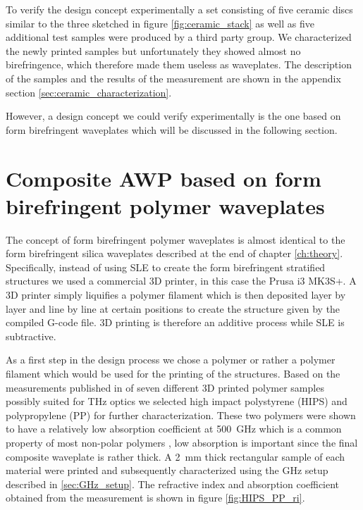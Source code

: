 To verify the design concept experimentally a set consisting of five ceramic discs similar to the three sketched in figure \ref{fig:ceramic_stack} as well as five additional test samples were produced by a third party group. We characterized the newly printed samples but unfortunately they showed almost no birefringence, which therefore made them useless as waveplates. The description of the samples and the results of the measurement are shown in the appendix section \ref{sec:ceramic_characterization}. 

However, a design concept we could verify experimentally is the one based on form birefringent waveplates which will be discussed in the following section.

\section{Composite AWP based on form birefringent polymer waveplates}
The concept of form birefringent polymer waveplates is almost identical to the form birefringent silica waveplates described at the end of chapter \ref{ch:theory}. Specifically, instead of using SLE to create the form birefringent stratified structures we used a commercial 3D printer, in this case the Prusa i3 MK3S+. A 3D printer simply liquifies a polymer filament which is then deposited layer by layer and line by line at certain positions to create the structure given by the compiled G-code file. 3D printing is therefore an additive process while SLE is subtractive.

As a first step in the design process we chose a polymer or rather a polymer filament which would be used for the printing of the structures. Based on the measurements published in \cite{Busch2014} of seven different 3D printed polymer samples possibly suited for THz optics we selected high impact polystyrene (HIPS) and polypropylene (PP) for further characterization. These two polymers were shown to have a relatively low absorption coefficient at \SI{500}{\giga \hertz} which is a common property of most non-polar polymers \cite{Jordens2010, Castro-Camus2020}, low absorption is important since the final composite waveplate is rather thick. A \SI{2}{\milli \meter} thick rectangular sample of each material were printed and subsequently characterized using the GHz setup described in \ref{sec:GHz_setup}. The refractive index and absorption coefficient obtained from the measurement is shown in figure \ref{fig:HIPS_PP_ri}.

